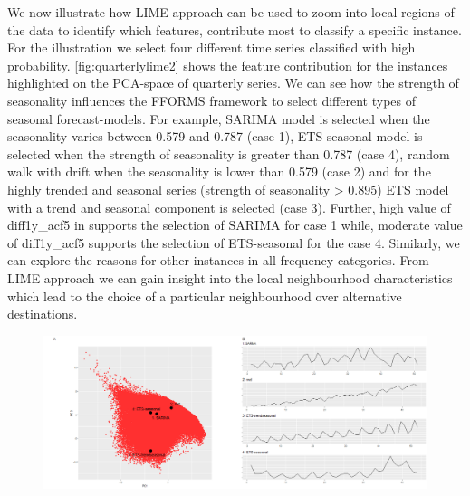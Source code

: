 \documentclass[11pt,a4paper,]{article}
\begin{document}
We now illustrate how LIME approach can be used to zoom into local regions of the data to identify which features, contribute most to classify a specific instance. For the illustration we select four different time series classified with high probability. \autoref{fig:quarterlylime2} shows the feature contribution for the instances highlighted on the PCA-space of quarterly series. We can see how the strength of seasonality influences the FFORMS framework to select different types of seasonal forecast-models. For example, SARIMA model is selected when the seasonality varies between 0.579 and 0.787 (case 1), ETS-seasonal model is selected when the strength of seasonality is greater than 0.787 (case 4), random walk with drift when the seasonality is lower than 0.579 (case 2) and for the highly trended and seasonal series (strength of seasonality \textgreater{} 0.895) ETS model with a trend and seasonal component is selected (case 3). Further, high value of diff1y\_acf5 in supports the selection of SARIMA for case 1 while, moderate value of diff1y\_acf5 supports the selection of ETS-seasonal for the case 4. Similarly, we can explore the reasons for other instances in all frequency categories. From LIME approach we can gain insight into the local neighbourhood characteristics which lead to the choice of a particular neighbourhood over alternative destinations.

\begin{figure}[h]

{\centering \includegraphics{figures/quarterlylime-1} 

}

\end{figure}
\end{document}
